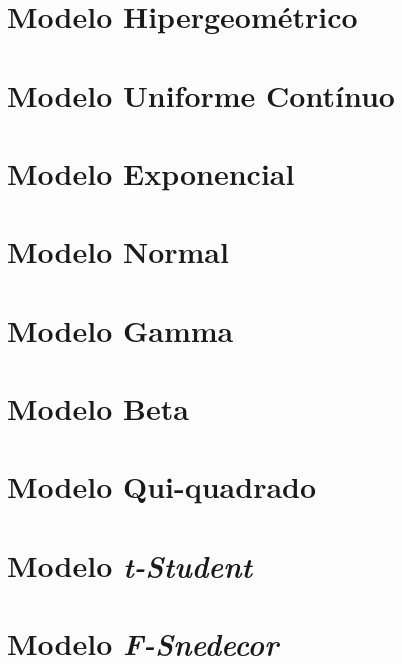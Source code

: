\documentclass[
  12pt,
  brazilian,
]{book}
\begin{document}
\hypertarget{modelo-hipergeomuxe9trico}{%
\section{Modelo Hipergeométrico}\label{modelo-hipergeomuxe9trico}}

\hypertarget{modelo-uniforme-contuxednuo}{%
\section{Modelo Uniforme Contínuo}\label{modelo-uniforme-contuxednuo}}

\hypertarget{modelo-exponencial}{%
\section{Modelo Exponencial}\label{modelo-exponencial}}

\hypertarget{modelo-normal}{%
\section{Modelo Normal}\label{modelo-normal}}

\hypertarget{modelo-gamma}{%
\section{Modelo Gamma}\label{modelo-gamma}}

\hypertarget{modelo-beta}{%
\section{Modelo Beta}\label{modelo-beta}}

\hypertarget{modelo-qui-quadrado}{%
\section{Modelo Qui-quadrado}\label{modelo-qui-quadrado}}

\hypertarget{modelo-t-student}{%
\section{\texorpdfstring{Modelo \emph{t-Student}}{Modelo t-Student}}\label{modelo-t-student}}

\hypertarget{modelo-f-snedecor}{%
\section{\texorpdfstring{Modelo \emph{F-Snedecor}}{Modelo F-Snedecor}}\label{modelo-f-snedecor}}
\end{document}
